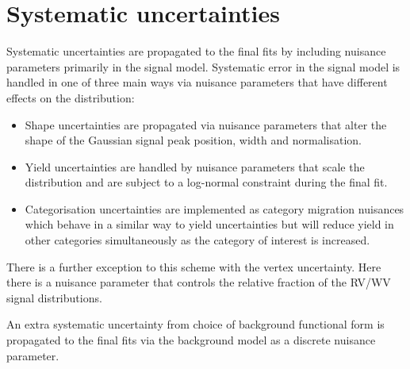 \section{Systematic uncertainties}
Systematic uncertainties are propagated to the final fits by including nuisance parameters primarily in the signal model. 
Systematic error in the signal model is handled in one of three main ways via nuisance parameters that have different effects on the \mgg distribution:
\begin{itemize}[noitemsep]
    \item Shape uncertainties are propagated via nuisance parameters that alter the shape of the Gaussian signal peak position, width and normalisation.
    \item Yield uncertainties are handled by nuisance parameters that scale the \mgg distribution and are subject to a log-normal constraint during the final fit.
    \item Categorisation uncertainties are implemented as category migration nuisances which behave in a similar way to yield uncertainties but will reduce yield in other categories simultaneously as the category of interest is increased.
\end{itemize}
There is a further exception to this scheme with the vertex uncertainty. Here there is a nuisance parameter that controls the relative fraction of the RV/WV signal distributions. 

An extra systematic uncertainty from choice of background functional form is propagated to the final fits via the background model as a discrete nuisance parameter. 



